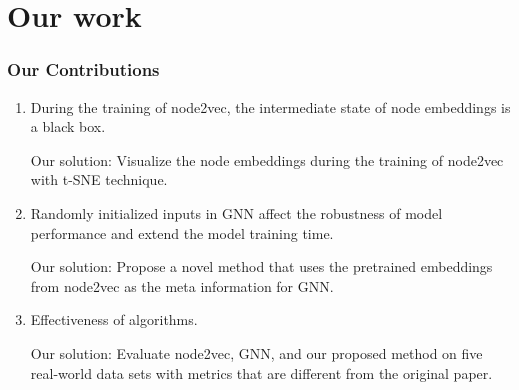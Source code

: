 \documentclass[notes, 10pt, aspectratio=169]{beamer}
\begin{document}
\section{Our work}
\begin{frame}
    \frametitle{Our Contributions}
    \begin{enumerate}
        \item During the training of node2vec, the intermediate state of node embeddings is a black box.\par
        Our solution: Visualize the node embeddings during the training of node2vec with t-SNE technique.
        \item Randomly initialized inputs in GNN affect the robustness of model performance and extend the model training time.\par
            Our solution: Propose a novel method that uses the pretrained embeddings from node2vec as the meta information for GNN.
        \item Effectiveness of algorithms.\par
            Our solution: Evaluate node2vec, GNN, and our proposed method on five real-world data sets with metrics that are different from the original paper.
    \end{enumerate}
\end{frame}
\end{document}

